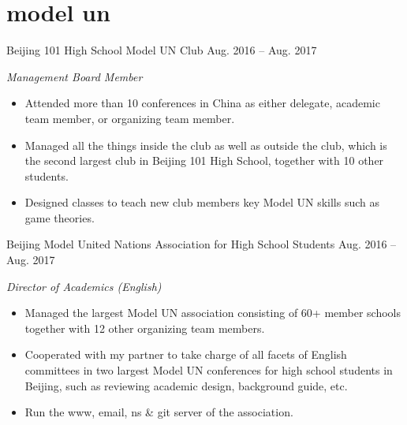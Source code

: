\documentclass[]{adamyi-cv} %
\begin{document}

\section{model un}

\begin{entrylist}


\entry
{Beijing 101 High School Model UN Club}
{Aug. 2016 -- Aug. 2017}
{\emph{Management Board Member}
\begin{itemize}
\item Attended more than 10 conferences in China as either delegate, academic team member, or organizing team member.
\item Managed all the things inside the club as well as outside the club, which is the second largest club in Beijing 101 High School, together with 10 other students.
\item Designed classes to teach new club members key Model UN skills such as game theories.
\end{itemize}}


\entry
{Beijing Model United Nations Association for High School Students}
{Aug. 2016 -- Aug. 2017}
{\emph{Director of Academics (English)}
\begin{itemize}
\item Managed the largest Model UN association consisting of 60+ member schools together with 12 other organizing team members.
\item Cooperated with my partner to take charge of all facets of English committees in two largest Model UN conferences for high school students in Beijing, such as reviewing academic design, background guide, etc.
\item Run the www, email, ns \& git server of the association.
\end{itemize}}


\end{entrylist}

\pagebreak


\end{document}
